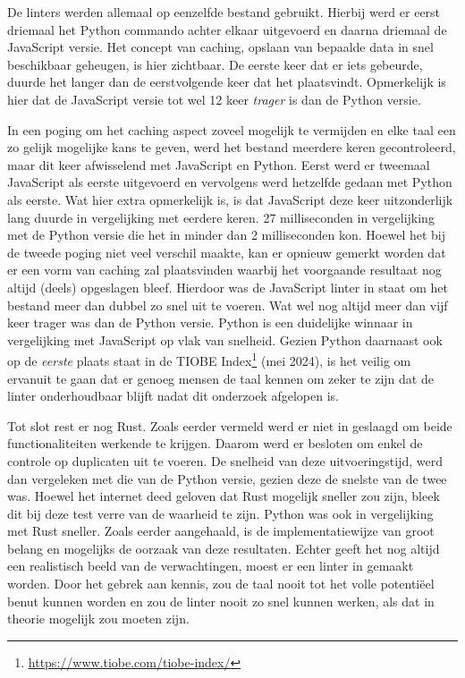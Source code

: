 De linters werden allemaal op eenzelfde bestand gebruikt. Hierbij werd er eerst driemaal het Python commando achter elkaar uitgevoerd en daarna driemaal de JavaScript versie. Het concept van caching, opslaan van bepaalde data in snel beschikbaar geheugen, is hier zichtbaar. De eerste keer dat er iets gebeurde, duurde het langer dan de eerstvolgende keer dat het plaatsvindt.
Opmerkelijk is hier dat de JavaScript versie tot wel 12 keer \emph{trager} is dan de Python versie.

In een poging om het caching aspect zoveel mogelijk te vermijden en elke taal een zo gelijk mogelijke kans te geven, werd het bestand meerdere keren gecontroleerd, maar dit keer afwisselend met JavaScript en Python. Eerst werd er tweemaal JavaScript als eerste uitgevoerd en vervolgens werd hetzelfde gedaan met Python als eerste. Wat hier extra opmerkelijk is, is dat JavaScript deze keer uitzonderlijk lang duurde in vergelijking met eerdere keren. 27 milliseconden in vergelijking met de Python versie die het in minder dan 2 milliseconden kon. Hoewel het bij de tweede poging niet veel verschil maakte, kan er opnieuw gemerkt worden dat er een vorm van caching zal plaatsvinden waarbij het voorgaande resultaat nog altijd (deels) opgeslagen bleef. Hierdoor was de JavaScript linter in staat om het bestand meer dan dubbel zo snel uit te voeren. Wat wel nog altijd meer dan vijf keer trager was dan de Python versie. Python is een duidelijke winnaar in vergelijking met JavaScript op vlak van snelheid. Gezien Python daarnaast ook op de \emph{eerste} plaats staat in de TIOBE Index\footnote{\url{https://www.tiobe.com/tiobe-index/}} (mei 2024), is het veilig om ervanuit te gaan dat er genoeg mensen de taal kennen om zeker te zijn dat de linter onderhoudbaar blijft nadat dit onderzoek afgelopen is.

Tot slot rest er nog Rust. Zoals eerder vermeld werd er niet in geslaagd om beide functionaliteiten werkende te krijgen. Daarom werd er besloten om enkel de controle op duplicaten uit te voeren. De snelheid van deze uitvoeringstijd, werd dan vergeleken met die van de Python versie, gezien deze de snelste van de twee was. Hoewel het internet deed geloven dat Rust mogelijk sneller zou zijn, bleek dit bij deze test verre van de waarheid te zijn. Python was ook in vergelijking met Rust sneller. Zoals eerder aangehaald, is de implementatiewijze van groot belang en mogelijks de oorzaak van deze resultaten. Echter geeft het nog altijd een realistisch beeld van de verwachtingen, moest er een linter in gemaakt worden. Door het gebrek aan kennis, zou de taal nooit tot het volle potentiëel benut kunnen worden en zou de linter nooit zo snel kunnen werken, als dat in theorie mogelijk zou moeten zijn.

